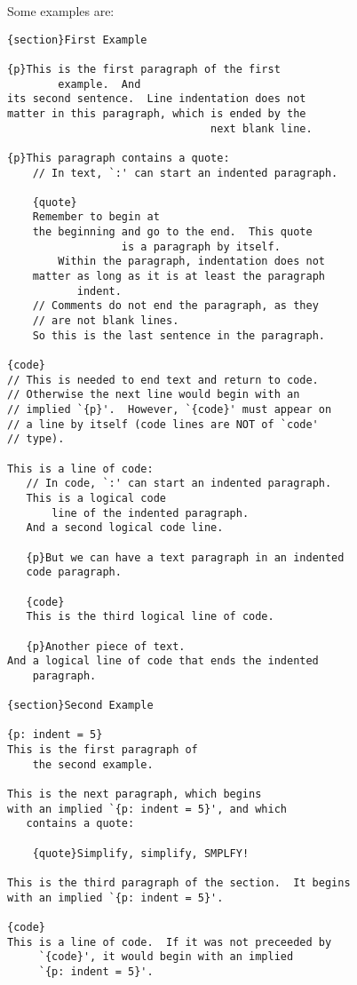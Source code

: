\documentclass[12pt]{article}
\newenvironment{indpar}[1][0.3in]%
	{\begin{list}{}%
		     {\setlength{\itemsep}{0in}%
		      \setlength{\topsep}{0in}%
		      \setlength{\parsep}{1ex}%
		      \setlength{\labelwidth}{#1}%
		      \setlength{\leftmargin}{#1}%
		      \addtolength{\leftmargin}{\labelsep}}%
	 \item}%
	{\end{list}}
\begin{document}
Some examples are:
\begin{indpar}\begin{verbatim}
{section}First Example

{p}This is the first paragraph of the first
        example.  And
its second sentence.  Line indentation does not
matter in this paragraph, which is ended by the
                                next blank line.

{p}This paragraph contains a quote:
    // In text, `:' can start an indented paragraph.

    {quote}
    Remember to begin at
    the beginning and go to the end.  This quote
                  is a paragraph by itself.
        Within the paragraph, indentation does not
    matter as long as it is at least the paragraph
           indent.
    // Comments do not end the paragraph, as they
    // are not blank lines.
    So this is the last sentence in the paragraph.

{code}
// This is needed to end text and return to code.
// Otherwise the next line would begin with an
// implied `{p}'.  However, `{code}' must appear on
// a line by itself (code lines are NOT of `code'
// type).

This is a line of code:
   // In code, `:' can start an indented paragraph.
   This is a logical code
       line of the indented paragraph.
   And a second logical code line.

   {p}But we can have a text paragraph in an indented
   code paragraph.

   {code}
   This is the third logical line of code.

   {p}Another piece of text.
And a logical line of code that ends the indented
    paragraph.

{section}Second Example

{p: indent = 5}
This is the first paragraph of
    the second example.

This is the next paragraph, which begins
with an implied `{p: indent = 5}', and which
   contains a quote:

    {quote}Simplify, simplify, SMPLFY!

This is the third paragraph of the section.  It begins
with an implied `{p: indent = 5}'.

{code}
This is a line of code.  If it was not preceeded by
     `{code}', it would begin with an implied
     `{p: indent = 5}'.
\end{verbatim}\end{indpar}
\end{document}
